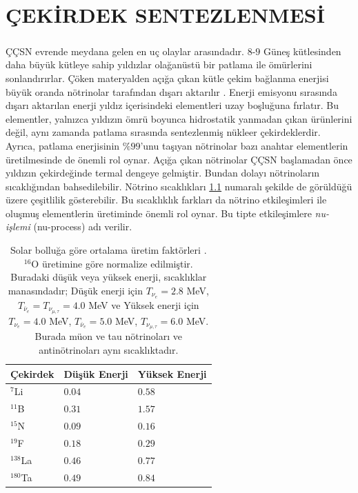 \newpage
\chapter{ÇEKİRDEK SENTEZLENMESİ}\label{ch:cekirdekSentez}
\paragraph{}
ÇÇSN evrende meydana gelen en uç olaylar arasındadır. $ 8$-$9 $ Güneş kütlesinden daha büyük kütleye sahip yıldızlar olağanüstü bir patlama ile ömürlerini sonlandırırlar. Çöken materyalden açığa çıkan kütle çekim bağlanma enerjisi büyük oranda nötrinolar tarafından dışarı aktarılır \cite{1966ApJ...143..626C, 1986ARA&A..24..205W, 1989ARA&A..27..629A}. Enerji emisyonu sırasında dışarı aktarılan enerji yıldız içerisindeki elementleri uzay boşluğuna fırlatır. Bu elementler, yalnızca yıldızın ömrü boyunca hidrostatik yanmadan çıkan ürünlerini değil, aynı zamanda patlama sırasında sentezlenmiş nükleer çekirdeklerdir. Ayrıca, patlama enerjisinin $ \% 99 $'unu taşıyan nötrinolar bazı anahtar elementlerin üretilmesinde de önemli rol oynar. Açığa çıkan nötrinolar ÇÇSN başlamadan önce yıldızın çekirdeğinde termal dengeye gelmiştir. Bundan dolayı nötrinoların sıcaklığından bahsedilebilir. Nötrino sıcaklıkları \ref{tbl:AvaregedProducitionFactors} numaralı şekilde de görüldüğü üzere çeşitlilik gösterebilir. Bu sıcaklıklık farkları da nötrino etkileşimleri ile oluşmuş elementlerin üretiminde önemli rol oynar. Bu tipte etkileşimlere \emph{nu-işlemi} (nu-process) adı verilir.
\begin{table}[hbt!]
    \centering
    \begin{tabular}{|l|l|l|}
    \hline
    Çekirdek    & Düşük Enerji & Yüksek Enerji \\ \hline
    $^{7}$Li    & $ 0.04 $     & $ 0.58 $ \\ \hline
    $^{11}$B    & $ 0.31 $     & $ 1.57 $ \\ \hline
    $^{15}$N    & $ 0.09 $     & $ 0.16 $\\ \hline
    $^{19}$F    & $0.18$       & $ 0.29 $\\ \hline
    $^{138}$La  & $0.46$       & $0.77  $ \\ \hline
    $^{180}$Ta  & $0.49$       & $0.84$ \\ \hline
    \end{tabular} 
    \caption[Solar Bolluğa Göre Ortalama Üretim Faktörleri.]{Solar bolluğa göre ortalama üretim faktörleri \cite{Sieverding:2018rdt}. $ ^{16} $O üretimine göre normalize edilmiştir. Buradaki düşük veya yüksek enerji, sıcaklıklar manasındadır; Düşük enerji için $ T_{\nu_{e}}=2.8 $ MeV, $ T_{\overline{\nu}_{e}}= T_{\nu_{\mu,\tau}}=4.0 $ MeV ve Yüksek enerji için $ T_{\nu_{e}}=4.0 $ MeV, $ T_{\overline{\nu}_{e}}=5.0$ MeV, $ T_{\nu_{\mu,\tau}}=6.0 $ MeV. Burada müon ve tau nötrinoları ve antinötrinoları aynı sıcaklıktadır.}\label{tbl:AvaregedProducitionFactors}
\end{table}

